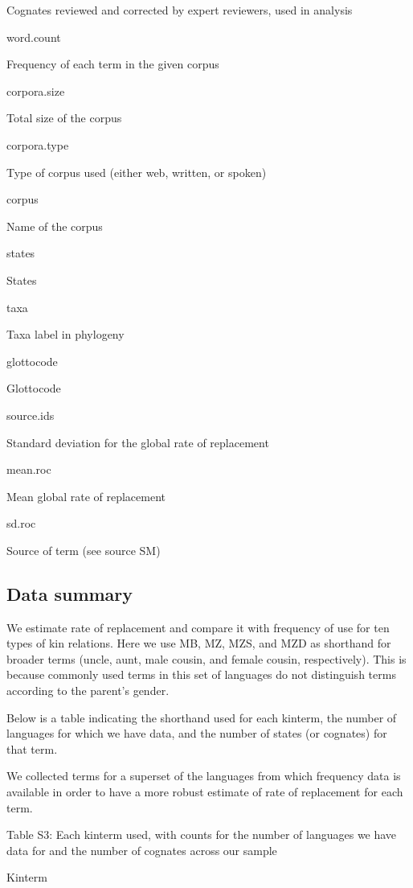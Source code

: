 \documentclass[]{article}
\begin{document}
Cognates reviewed and corrected by expert reviewers, used in analysis

word.count

Frequency of each term in the given corpus

corpora.size

Total size of the corpus

corpora.type

Type of corpus used (either web, written, or spoken)

corpus

Name of the corpus

states

States

taxa

Taxa label in phylogeny

glottocode

Glottocode

source.ids

Standard deviation for the global rate of replacement

mean.roc

Mean global rate of replacement

sd.roc

Source of term (see source SM)

\hypertarget{data-summary}{%
\subsection{Data summary}\label{data-summary}}

We estimate rate of replacement and compare it with frequency of use for
ten types of kin relations. Here we use MB, MZ, MZS, and MZD as
shorthand for broader terms (uncle, aunt, male cousin, and female
cousin, respectively). This is because commonly used terms in this set
of languages do not distinguish terms according to the parent's gender.

Below is a table indicating the shorthand used for each kinterm, the
number of languages for which we have data, and the number of states (or
cognates) for that term.

We collected terms for a superset of the languages from which frequency
data is available in order to have a more robust estimate of rate of
replacement for each term.

Table S3: Each kinterm used, with counts for the number of languages we
have data for and the number of cognates across our sample

Kinterm
\end{document}
